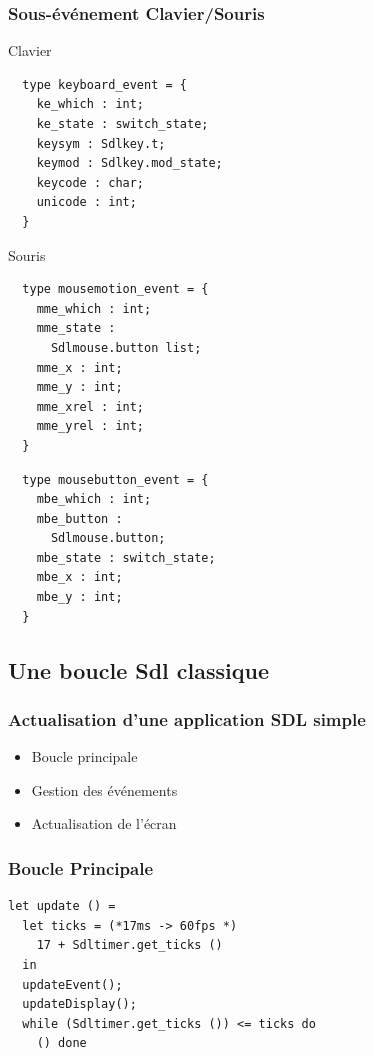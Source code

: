 \begin{frame}[fragile]
	\frametitle{Sous-événement Clavier/Souris}
	\lstset{basicstyle=\scriptsize}
	\begin{block}{Clavier}
		\begin{lstlisting}
  type keyboard_event = {
    ke_which : int;
    ke_state : switch_state;
    keysym : Sdlkey.t;
    keymod : Sdlkey.mod_state;
    keycode : char;
    unicode : int;
  }
		\end{lstlisting}
	\end{block}
	\begin{block}{Souris}
		\begin{minipage}{0.47\textwidth}
			\begin{lstlisting}
  type mousemotion_event = {
    mme_which : int;
    mme_state : 
      Sdlmouse.button list;
    mme_x : int;
    mme_y : int;
    mme_xrel : int;
    mme_yrel : int;
  }
			\end{lstlisting}
		\end{minipage}
		\begin{minipage}{0.4\textwidth}
			\begin{lstlisting}
  type mousebutton_event = {
    mbe_which : int;
    mbe_button : 
      Sdlmouse.button;
    mbe_state : switch_state;
    mbe_x : int;
    mbe_y : int;
  }
			\end{lstlisting}
		\end{minipage}
	\end{block}
\end{frame}

\subsection{Une boucle Sdl classique} %
\begin{frame}[fragile]
	\frametitle{Actualisation d'une application SDL simple}
	\large
	\begin{itemize}
		\item Boucle principale
		\item Gestion des événements
		\item Actualisation de l'écran
	\end{itemize}
\end{frame}

\begin{frame}[fragile]
	\frametitle{Boucle Principale}
	\begin{lstlisting}
let update () =
  let ticks = (*17ms -> 60fps *) 
    17 + Sdltimer.get_ticks () 
  in
  updateEvent();
  updateDisplay();
  while (Sdltimer.get_ticks ()) <= ticks do 
    () done
	\end{lstlisting}
\end{frame}

